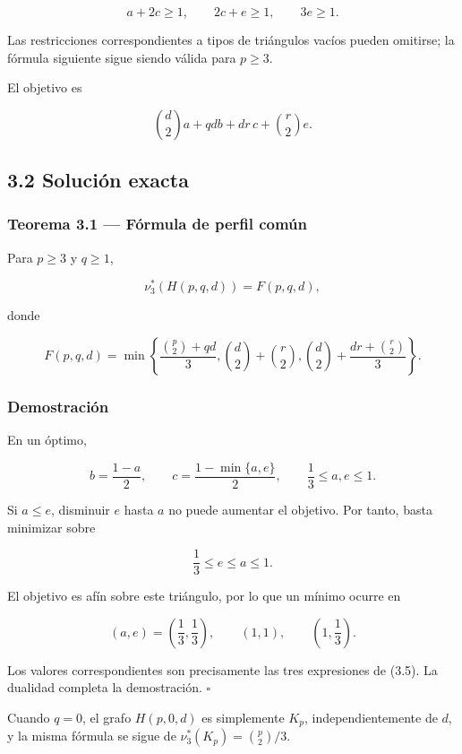 \documentclass[
  spanish,
  11pt,
  a4paper,
]{article}
\begin{document}
\[
a+2c\ge1,
\qquad
2c+e\ge1,
\qquad
3e\ge1.
\tag{3.2}
\]

Las restricciones correspondientes a tipos de triángulos vacíos pueden omitirse; la fórmula siguiente sigue siendo válida para \(p\ge3\).

El objetivo es

\[
\binom d2a+qdb+dr\,c+\binom r2e.
\tag{3.3}
\]

\subsection{3.2 Solución exacta}\label{soluciuxf3n-exacta}

\subsubsection{Teorema 3.1 --- Fórmula de perfil común}\label{teorema-3.1-fuxf3rmula-de-perfil-comuxfan}

Para \(p\ge3\) y \(q\ge1\),

\[
\boxed{
\nu_3^*(H(p,q,d))
=
F(p,q,d),
}
\tag{3.4}
\]

donde

\[
\boxed{
F(p,q,d)
=
\min\left\{
\frac{\binom p2+qd}{3},
\binom d2+\binom r2,
\binom d2+\frac{dr+\binom r2}{3}
\right\}.
}
\tag{3.5}
\]

\subsubsection{Demostración}\label{demostraciuxf3n}

En un óptimo,

\[
b=\frac{1-a}{2},
\qquad
c=\frac{1-\min\{a,e\}}2,
\qquad
\frac13\le a,e\le1.
\]

Si \(a\le e\), disminuir \(e\) hasta \(a\) no puede aumentar el objetivo. Por tanto, basta minimizar sobre

\[
\frac13\le e\le a\le1.
\]

El objetivo es afín sobre este triángulo, por lo que un mínimo ocurre en

\[
(a,e)=\left(\frac13,\frac13\right),
\qquad
(1,1),
\qquad
\left(1,\frac13\right).
\]

Los valores correspondientes son precisamente las tres expresiones de (3.5). La dualidad completa la demostración. \(\square\)

Cuando \(q=0\), el grafo \(H(p,0,d)\) es simplemente \(K_p\), independientemente de \(d\), y la misma fórmula se sigue de \(\nu_3^*(K_p)=\binom p2/3\).
\end{document}
